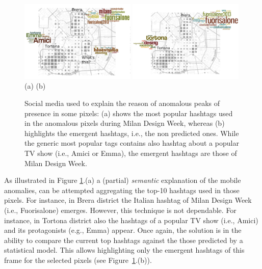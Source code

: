 \begin{figure}[h]
\begin{center}
\includegraphics[width=0.49\textwidth]{img/mdw-ht-1} 
\includegraphics[width=0.49\textwidth]{img/mdw-ht-2} 
(a)\hspace{150pt} (b)
\caption{Social media used  to explain the reason of anomalous peaks of presence  in some pixels: (a) shows the most popular hashtags used in the anomalous pixels during Milan Design Week, whereas (b) highlights the emergent hashtags, i.e., the non predicted ones. While the generic most popular tags contains also hashtag about a popular TV show (i.e., Amici or Emma), the emergent hashtags are those of Milan Design Week.}
\label{fig:de}
\end{center}
\end{figure}

As illustrated in Figure \ref{fig:de}.(a) a (partial) \textit{semantic} explanation of the mobile anomalies, can be attempted aggregating the top-10 hashtags used in those pixels. For instance, in Brera district the Italian hashtag of Milan Design Week (i.e., Fuorisalone) emerges. However, this technique is not dependable. For instance, in Tortona district also the hashtags of a popular TV show (i.e., Amici) and its protagonists (e.g., Emma) appear. Once again, the solution is in the ability to compare the current top hashtags against the those predicted by a statistical model. This allows highlighting only the emergent hashtags of this frame for the selected pixels  (see Figure~\ref{fig:de}.(b)).

